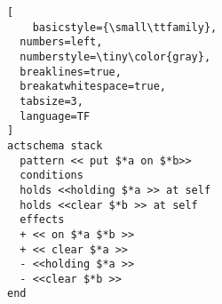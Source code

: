 \begin{lstlisting}[
    basicstyle={\small\ttfamily},
  numbers=left,
  numberstyle=\tiny\color{gray},
  breaklines=true,
  breakatwhitespace=true,
  tabsize=3,
  language=TF
]
actschema stack
  pattern << put $*a on $*b>>
  conditions
  holds <<holding $*a >> at self
  holds <<clear $*b >> at self
  effects
  + << on $*a $*b >>
  + << clear $*a >>
  - <<holding $*a >>
  - <<clear $*b >>
end
\end{lstlisting}